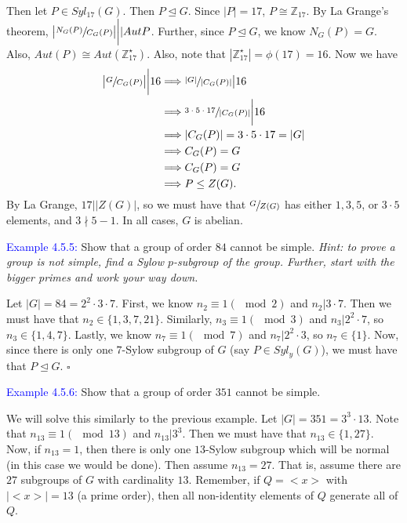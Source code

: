 \documentclass{article}
\begin{document}
Then let $P \in Syl_{17}(G)$. Then $P \trianglelefteq G$. Since $|P|=17$, $P \cong \mathbb{Z}_{17}$. By La Grange's theorem, 
$\big| \sfrac{N_G(P)}{C_G(P)}\big| \bigg| |Aut{P}$. Further, since $P \trianglelefteq G$, we know $N_G(P)=G$. Also, 
$Aut(P) \cong Aut(\mathbb{Z}_{17}^{\star})$. Also, note that $|\mathbb{Z}_{17}^{\star}| = \phi(17)=16$. Now we have
\begin{align*}
    \big| \sfrac{G}{C_G(P)} \big| \bigg| 16 &\Longrightarrow \sfrac{|G|}{|C_G(P)|} \big| 16 \\
    &\Longrightarrow \sfrac{3 \cdot 5 \cdot 17}{|C_G(P)|} \bigg| 16 \\
    &\Longrightarrow |C_G(P)| = 3 \cdot 5 \cdot 17 = |G| \\
    &\Longrightarrow C_G(P) = G \\
    &\Longrightarrow C_G(P) = G \\
    &\Longrightarrow P \leq Z(G).
\end{align*}
By La Grange, $17 \big| |Z(G)|$, so we must have that $\sfrac{G}{Z(G)}$ has either $1,3,5$, or $3 \cdot 5$ elements, and $3 \nmid 5-1$. 
In all cases, $G$ is abelian.

\textcolor{blue}{Example 4.5.5:} Show that a group of order $84$ cannot be simple. \textit{Hint: to prove a group is not simple, find a 
Sylow $p$-subgroup of the group. Further, start with the bigger primes and work your way down.}

Let $|G|=84=2^2 \cdot 3 \cdot 7$. First, we know $n_2 \equiv 1(\mod{2})$ and $n_2 | 3 \cdot 7$. Then we must have that 
$n_2 \in \{1,3,7,21\}$. Similarly, $n_3 \equiv 1(\mod{3})$ and $n_3 | 2^2 \cdot 7$, so $n_3 \in \{1,4,7\}$. Lastly, we know $n_7 \equiv 1(\mod{7})$ and $n_7 | 2^2 \cdot 3$, so $n_7 \in \{1\}$. Now, since there is only one $7$-Sylow subgroup of $G$ (say $P \in Syl_y(G)$), we must have that $P \trianglelefteq G$. $\square$

\textcolor{blue}{Example 4.5.6:} Show that a group of order $351$ cannot be simple.

We will solve this similarly to the previous example. Let $|G| = 351 = 3^3 \cdot 13$. Note that $n_{13} \equiv 1(\mod{13})$ and 
$n_{13} | 3^3$. Then we must have that $n_{13} \in \{1, 27\}$. Now, if $n_{13}=1$, then there is only one $13$-Sylow subgroup which will 
be normal (in this case we would be done). Then assume $n_{13}=27$. That is, assume there are $27$ subgroups of $G$ with cardinality $13$. 
Remember, if $Q = <x>$ with $|<x>|=13$ (a prime order), then all non-identity elements of $Q$ generate all of $Q$. 
\end{document}
